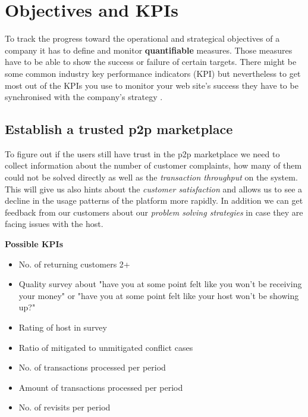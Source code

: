 \section{Objectives and KPIs} %
\label{sec:obj_kpis}

To track the progress toward the operational and strategical objectives of a company it has to define and monitor {\bf quantifiable} measures. Those measures have to be able to show the success or failure of certain targets. There might be some common industry key performance indicators (KPI) but nevertheless to get most out of the KPIs you use to monitor your web site's success they have to be synchronised with the company's strategy \citep[p. 347-349]{Kaushik07}.

\subsection{Establish a trusted p2p marketplace}
To figure out if the users still have trust in the p2p marketplace we need to collect information about the number of customer complaints, how many of them could not be solved directly as well as the \textit{transaction throughput} on the system. This will give us also hints about the \textit{customer satisfaction} and allows us to see a decline in the usage patterns of the platform more rapidly. In addition we can get feedback from our customers about our \textit{problem solving strategies} in case they are facing issues with the host.

\begin{description}
	\item \textbf{Possible KPIs}
	\begin{itemize}
    	\item No. of returning customers 2+
        \item Quality survey about "have you at some point felt like you won't be receiving your money" or "have you at some point felt like your host won't be showing up?"
        \item Rating of host in survey
        \item Ratio of mitigated to unmitigated conflict cases
        \item No. of transactions processed per period
        \item Amount of transactions processed per period
        \item No. of revisits per period
    \end{itemize}
\end{description}

